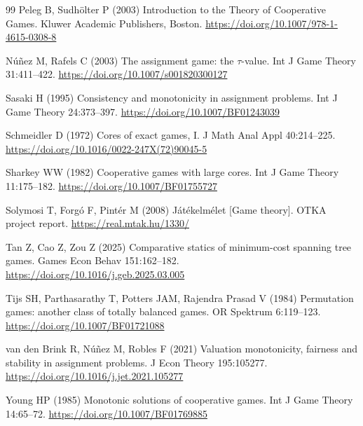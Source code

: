 \documentclass[11pt]{article}
\begin{document}
\begin{thebibliography}{99}
Peleg B, Sudh\"olter P (2003) Introduction to the Theory of Cooperative
Games. Kluwer Academic Publishers, Boston.
\url{https://doi.org/10.1007/978-1-4615-0308-8}

N\'u\~nez M, Rafels C (2003) The assignment game: the $\tau$-value.
Int J Game Theory 31:411--422.
\url{https://doi.org/10.1007/s001820300127}

Sasaki H (1995) Consistency and monotonicity in assignment problems.
Int J Game Theory 24:373--397.
\url{https://doi.org/10.1007/BF01243039}

Schmeidler D (1972) Cores of exact games, I.
J Math Anal Appl 40:214--225.
\url{https://doi.org/10.1016/0022-247X(72)90045-5}

Sharkey WW (1982) Cooperative games with large cores.
Int J Game Theory 11:175--182.
\url{https://doi.org/10.1007/BF01755727}

Solymosi T, Forg\'o F, Pint\'er M (2008) J\'at\'ekelm\'elet [Game theory].
OTKA project report. \url{https://real.mtak.hu/1330/}

Tan Z, Cao Z, Zou Z (2025) Comparative statics of minimum-cost spanning
tree games. Games Econ Behav 151:162--182.
\url{https://doi.org/10.1016/j.geb.2025.03.005}

Tijs SH, Parthasarathy T, Potters JAM, Rajendra Prasad V (1984)
Permutation games: another class of totally balanced games.
OR Spektrum 6:119--123.
\url{https://doi.org/10.1007/BF01721088}

van den Brink R, N\'u\~nez M, Robles F (2021) Valuation monotonicity,
fairness and stability in assignment problems.
J Econ Theory 195:105277.
\url{https://doi.org/10.1016/j.jet.2021.105277}

Young HP (1985) Monotonic solutions of cooperative games.
Int J Game Theory 14:65--72.
\url{https://doi.org/10.1007/BF01769885}

\end{thebibliography}
\end{document}
